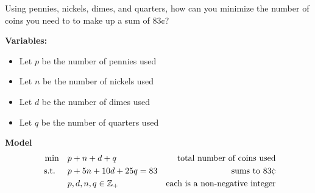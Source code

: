 \documentclass[../open-optimization/open-optimization.tex]{subfiles}
\begin{document}
\begin{example}
\label{ex:min-coins}
Using pennies, nickels, dimes, and quarters, how can you minimize the number of coins you need to to make up a sum of $83\cent$? 

\textbf{Variables:}
\begin{itemize}
\item Let $p$ be the number of pennies used
\item Let $n$ be the number of nickels used
\item Let $d$ be the number of dimes used
\item Let $q$ be the number of quarters used
\end{itemize}
\textbf{Model}
\begin{align*}
\min \quad & p + n + d + q & \text{ total number of coins used}\\
\text{ s.t. } \quad & p + 5n + 10d + 25 q = 83 & \text{sums to } 83 \cent\\
& p,d,n,q \in \Z_+ & \text{each is a non-negative integer}
\end{align*}
\end{example}
\end{document}
